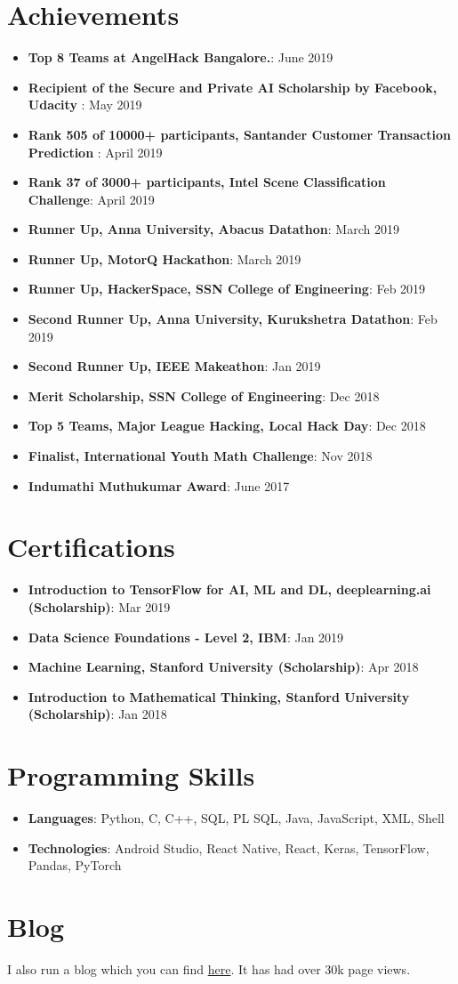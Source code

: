 \documentclass[letterpaper,11pt]{article}
\newcommand{\resumeItem}[2]{
  \item\small{
    \textbf{#1}{: #2 \vspace{-2pt}}
  }
}
\newcommand{\resumeSubItem}[2]{\resumeItem{#1}{#2}\vspace{-4pt}}
\newcommand{\resumeSubHeadingListStart}{\begin{itemize}[leftmargin=*]}
\newcommand{\resumeSubHeadingListEnd}{\end{itemize}}
\begin{document}
\section{Achievements}
  \resumeSubHeadingListStart
    \resumeSubItem
  {Top 8 Teams at AngelHack Bangalore.}{June 2019}
  \resumeSubItem
  {Recipient of the Secure and Private AI Scholarship by Facebook, Udacity }{May 2019}
  \resumeSubItem
  {Rank 505 of 10000+ participants, Santander Customer Transaction Prediction }{April 2019}
           \resumeSubItem
  {Rank 37 of 3000+ participants, Intel Scene Classification Challenge}{April 2019}
      \resumeSubItem
  {Runner Up, Anna University, Abacus Datathon}{March 2019}
         \resumeSubItem
  {Runner Up, MotorQ Hackathon}{March 2019}
      \resumeSubItem
  {Runner Up, HackerSpace, SSN College of Engineering}{Feb 2019}
    \resumeSubItem
  {Second Runner Up, Anna University, Kurukshetra Datathon}{Feb 2019}
  \resumeSubItem
  {Second Runner Up, IEEE Makeathon}{Jan 2019} 	
  \resumeSubItem
  {Merit Scholarship, SSN College of Engineering}{Dec 2018}
     \resumeSubItem
      {Top 5 Teams, Major League Hacking, Local Hack Day}{Dec 2018}
  \resumeSubItem
    {Finalist, International Youth Math Challenge}{Nov 2018}
    \resumeSubItem
      {Indumathi Muthukumar Award}{June 2017}
  \resumeSubHeadingListEnd


\section{Certifications}
  \resumeSubHeadingListStart
      \resumeSubItem
  {Introduction to TensorFlow for AI, ML and DL, deeplearning.ai (Scholarship)}{Mar 2019}
    \resumeSubItem
      {Data Science Foundations - Level 2, IBM}{Jan 2019}
    \resumeSubItem
  {Machine Learning, Stanford University (Scholarship)}{Apr 2018}
    \resumeSubItem
  {Introduction to Mathematical Thinking, Stanford University (Scholarship)}{Jan 2018} 	
\resumeSubHeadingListEnd

\section{Programming Skills}
  \resumeSubHeadingListStart
   \item{
     \textbf{Languages}{: Python, C, C++, SQL, PL SQL, Java, JavaScript, XML, Shell}
      }
      \item{
       \textbf{Technologies}{: Android Studio, React Native, React, Keras, TensorFlow, Pandas, PyTorch}
    }
  \resumeSubHeadingListEnd

\section{Blog}
I also run a blog which you can find  \href{https://rohitmidha23.github.io/blog}{here}. It has had over 30k page views.
\end{document}
